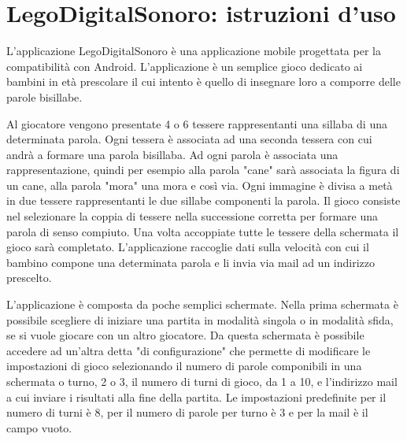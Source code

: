 \renewcommand*{\mypath}{legodigitalsonoro1}%
\graphicspath{{\mypath/images/}}



\section{LegoDigitalSonoro: istruzioni d'uso}

L'applicazione LegoDigitalSonoro è una applicazione mobile progettata per la compatibilità con Android. L'applicazione è un semplice gioco dedicato ai bambini in età prescolare il cui intento è quello di insegnare loro a comporre delle parole bisillabe.

Al giocatore vengono presentate 4 o 6 tessere rappresentanti una sillaba di una determinata parola. Ogni tessera è associata ad una seconda tessera con cui andrà a formare una parola bisillaba. Ad ogni parola è associata una rappresentazione, quindi per esempio alla parola "cane" sarà associata la figura di un cane, alla parola "mora" una mora e così via. Ogni immagine è divisa a metà in due tessere rappresentanti le due sillabe componenti la parola. Il gioco consiste nel selezionare la coppia di tessere nella successione corretta per formare una parola di senso compiuto. Una volta accoppiate tutte le tessere della schermata il gioco sarà completato. L'applicazione raccoglie dati sulla velocità con cui il bambino compone una determinata parola e li invia via mail ad un indirizzo prescelto.

L'applicazione è composta da poche semplici schermate. Nella prima schermata è possibile scegliere di iniziare una partita in modalità singola o in modalità sfida, se si vuole giocare con un altro giocatore. Da questa schermata è possibile accedere ad un'altra detta "di configurazione" che permette di modificare le impostazioni di gioco selezionando il numero di parole componibili in una schermata o turno, 2 o 3, il numero di turni di gioco, da 1 a 10, e l'indirizzo mail a cui inviare i risultati alla fine della partita. Le impostazioni predefinite per il numero di turni è 8, per il numero di parole per turno è 3 e per la mail è il campo vuoto.



